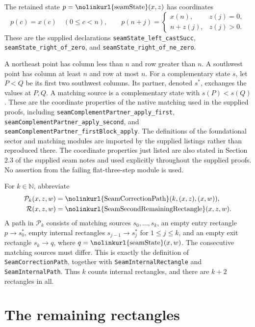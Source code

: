 \documentclass[11pt,oneside]{report}
\theoremstyle{definition}
\numberwithin{equation}{section}
\newcommand{\nat}{\mathbb N}
\newcommand{\decl}[1]{\textnormal{\nolinkurl{#1}}}
\newcommand{\cP}{\mathcal P}
\newcommand{\cR}{\mathcal R}
\begin{document}
The retained state $p=\decl{seamState}(x,z)$ has coordinates
\begin{equation}\label{J06:eq:seam}
 p(c)=x(c)\quad(0\le c<n),\qquad
 p(n+j)=
 \begin{cases}x(n),&z(j)=0,\\ n+z(j),&z(j)>0.
 \end{cases}
\end{equation}
These are the supplied declarations
\decl{seamState_left_castSucc},
\decl{seamState_right_of_zero}, and
\decl{seamState_right_of_ne_zero}.

A northeast point has column less than $n$ and row greater than $n$.
A southwest point has column at least $n$ and row at most $n$.
For a complementary state $s$, let $P<Q$ be its first two southwest
columns. Its partner, denoted $s^*$, exchanges the values at $P,Q$.
A matching source is a complementary state with $s(P)<s(Q)$.
These are the coordinate properties of the native matching used in the
supplied proofs, including
\decl{seamComplementPartner_apply_first},
\decl{seamComplementPartner_apply_second}, and
\decl{seamComplementPartner_firstBlock_apply}.
The definitions of the foundational sector and matching modules are
imported by the supplied listings rather than reproduced there. The
coordinate properties just listed are also stated in Section 2.3 of the
supplied seam notes and used explicitly throughout the supplied proofs.
No assertion from the failing flat-three-step module is used.

For $k\in\nat$, abbreviate
\[
 \begin{aligned}
 \cP_k(x,z,w)&=
 \decl{SeamCorrectionPath}(k,(x,z),(x,w)),\\
 \cR(x,z,w)&=\decl{SeamSecondRemainingRectangle}(x,z,w).
 \end{aligned}
\]
A path in $\cP_k$ consists of matching sources $s_0,\ldots,s_k$,
an empty entry rectangle $p\longrightarrow s_0^*$, empty internal
rectangles $s_{j-1}\longrightarrow s_j^*$ for $1\le j\le k$, and an
empty exit rectangle $s_k\longrightarrow q$, where
$q=\decl{seamState}(x,w)$. The consecutive matching sources must differ.
This is exactly the definition of \decl{SeamCorrectionPath}, together
with \decl{SeamInternalRectangle} and \decl{SeamInternalPath}.
Thus $k$ counts internal rectangles, and there are $k+2$ rectangles in
all.

\section{The remaining rectangles}
\end{document}
